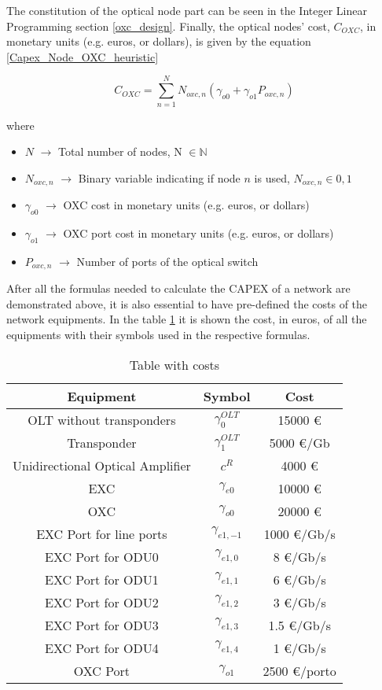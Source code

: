 The constitution of the optical node part can be seen in the Integer Linear Programming section \ref{oxc_design}. Finally, the optical nodes' cost, $C_{OXC}$, in monetary units (e.g. euros, or dollars), is given by the equation \ref{Capex_Node_OXC_heuristic}

\begin{equation}
C_{OXC} = \sum_{n=1}^{N} N_{oxc,n} \left( \gamma_{o0} + \gamma_{o1} P_{oxc,n} \right)
\label{Capex_Node_OXC_heuristic}
\end{equation}

\noindent
where

\begin{itemize}
\item{$N$				$\rightarrow$	Total number of nodes, N $\in \mathbb{N}$}
\item{$N_{oxc,n}$		$\rightarrow$	Binary variable indicating if node $n$ is used, $N_{oxc,n} \in {0, 1}$}
\item{$\gamma_{o0}$ 	$\rightarrow$	OXC cost in monetary units (e.g. euros, or dollars)}
\item{$\gamma_{o1}$ 	$\rightarrow$	OXC port cost in monetary units (e.g. euros, or dollars) }
\item{$P_{oxc,n}$	    $\rightarrow$	Number of ports of the optical switch}
\end{itemize}

After all the formulas needed to calculate the CAPEX of a network are demonstrated above, it is also essential to have pre-defined the costs of the network equipments. In the table \ref{table_cost_heuristic} it is shown the cost, in euros, of all the equipments with their symbols used in the respective formulas.\\

\begin{table}[H]
\centering
\begin{tabular}{|| c | c | c||}
 \hline
 Equipment & Symbol & Cost \\
 \hline\hline
 OLT without transponders & $\gamma_0^{OLT}$ & 15000 \euro \\
 Transponder & $\gamma_1^{OLT}$ & 5000 \euro/Gb \\
 Unidirectional Optical Amplifier & $c^R$ & 4000 \euro \\
 EXC & $\gamma_{e0}$ & 10000 \euro \\
 OXC & $\gamma_{o0}$ & 20000 \euro \\
 EXC Port for line ports & $\gamma_{e1,-1}$ & 1000 \euro /Gb/s\\
 EXC Port for ODU0 & $\gamma_{e1,0}$ & 8 \euro /Gb/s\\
 EXC Port for ODU1 & $\gamma_{e1,1}$ & 6 \euro /Gb/s\\
 EXC Port for ODU2 & $\gamma_{e1,2}$ & 3 \euro /Gb/s\\
 EXC Port for ODU3 & $\gamma_{e1,3}$ & 1.5 \euro /Gb/s\\
 EXC Port for ODU4 & $\gamma_{e1,4}$ & 1 \euro /Gb/s\\
 OXC Port & $\gamma_{o1}$ & 2500 \euro /porto \\
 \hline
\end{tabular}
\caption{Table with costs}
\label{table_cost_heuristic}
\end{table}
